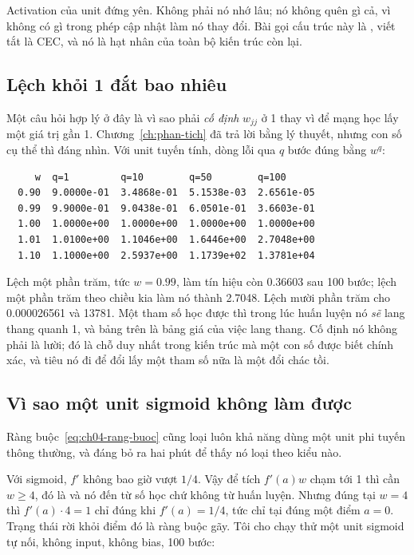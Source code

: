 Activation của unit đứng yên. Không phải nó nhớ lâu; nó không quên gì cả, vì
không có gì trong phép cập nhật làm nó thay đổi. Bài gọi cấu trúc này là
, viết tắt là CEC, và nó
là hạt nhân của toàn bộ kiến trúc còn lại.

\subsection*{Lệch khỏi 1 đắt bao nhiêu}

%
Một câu hỏi hợp lý ở đây là vì sao phải \emph{cố định} \(w_{jj}\) ở 1 thay vì
để mạng học lấy một giá trị gần 1. Chương~\ref{ch:phan-tich} đã trả lời bằng lý
thuyết, nhưng con số cụ thể thì đáng nhìn. Với unit tuyến tính, dòng lỗi qua
\(q\) bước đúng bằng \(w^{q}\):

\begin{verbatim}
     w  q=1         q=10        q=50        q=100
  0.90  9.0000e-01  3.4868e-01  5.1538e-03  2.6561e-05
  0.99  9.9000e-01  9.0438e-01  6.0501e-01  3.6603e-01
  1.00  1.0000e+00  1.0000e+00  1.0000e+00  1.0000e+00
  1.01  1.0100e+00  1.1046e+00  1.6446e+00  2.7048e+00
  1.10  1.1000e+00  2.5937e+00  1.1739e+02  1.3781e+04
\end{verbatim}

Lệch một phần trăm, tức \(w = 0.99\), làm tín hiệu còn 0.36603 sau 100 bước;
lệch một phần trăm theo chiều kia làm nó thành 2.7048. Lệch mười phần trăm cho
0.000026561 và 13781. Một tham số học được thì trong lúc huấn luyện nó \emph{sẽ}
lang thang quanh 1, và bảng trên là bảng giá của việc lang thang. Cố định nó
không phải là lười; đó là chỗ duy nhất trong kiến trúc mà một con số được biết
chính xác, và tiêu nó đi để đổi lấy một tham số nữa là một đổi chác tồi.

\subsection*{Vì sao một unit sigmoid không làm được}

%
Ràng buộc~\eqref{eq:ch04-rang-buoc} cũng loại luôn khả năng dùng một unit phi
tuyến thông thường, và đáng bỏ ra hai phút để thấy nó loại theo kiểu nào.

Với sigmoid, \(f'\) không bao giờ vượt \(1/4\). Vậy để tích \(f'(a) w\) chạm
tới 1 thì cần \(w \ge 4\), đó là  và nó
đến từ số học chứ không từ
huấn luyện. Nhưng đúng tại \(w = 4\) thì \(f'(a) \cdot 4 = 1\) chỉ đúng khi
\(f'(a) = 1/4\), tức chỉ tại đúng một điểm \(a = 0\). Trạng thái rời khỏi điểm
đó là ràng buộc gãy. Tôi cho chạy thử một unit sigmoid tự nối, không input,
không bias, 100 bước:


